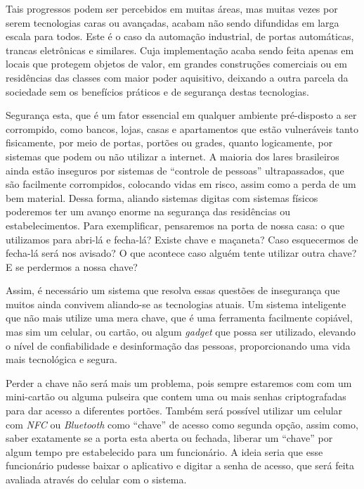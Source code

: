 \documentclass[12pt]{article}
\begin{document}
Tais progressos podem ser percebidos em muitas áreas, mas muitas vezes por serem tecnologias caras ou avançadas, acabam não sendo difundidas em larga escala para todos. Este é o caso da automação industrial, de portas automáticas, trancas eletrônicas e similares. Cuja implementação acaba sendo feita apenas em locais que protegem objetos de valor, em grandes construções comerciais ou em residências das classes com maior poder aquisitivo, deixando a outra parcela da sociedade sem os benefícios práticos e de segurança destas tecnologias.

Segurança esta, que é um fator essencial em qualquer ambiente pré-disposto a ser corrompido, como bancos, lojas, casas e apartamentos que estão vulneráveis tanto fisicamente,  por meio de portas, portões ou grades, quanto logicamente, por sistemas que podem ou não utilizar a internet. A maioria dos lares brasileiros ainda estão inseguros por sistemas de “controle de pessoas” ultrapassados, que são facilmente corrompidos, colocando vidas em risco, assim como a perda de um bem material. Dessa forma, aliando sistemas digitas com sistemas físicos poderemos ter um avanço enorme na segurança das residências ou estabelecimentos. Para exemplificar, pensaremos na porta de nossa casa: o que utilizamos para abri-lá e fecha-lá? Existe chave e maçaneta? Caso esquecermos de fecha-lá será nos avisado? O que acontece caso alguém tente utilizar outra chave? E se perdermos a nossa chave?

Assim, é necessário um sistema que resolva essas questões de insegurança que muitos ainda convivem aliando-se as tecnologias atuais. Um sistema inteligente que não mais utilize uma mera chave, que é uma ferramenta facilmente copiável, mas sim um celular, ou cartão, ou algum \textit{gadget} que possa ser utilizado, elevando o nível de confiabilidade e desinformação das pessoas, proporcionando uma vida mais tecnológica e segura.

Perder a chave não será mais um problema, pois sempre estaremos com com um mini-cartão ou alguma pulseira que contem uma ou mais  senhas criptografadas para dar acesso a diferentes portões. Também será possível utilizar um celular com \textit{NFC} ou \textit{Bluetooth} como “chave” de acesso  como segunda opção, assim como, saber exatamente se a porta esta aberta ou fechada, liberar um “chave” por algum tempo pre estabelecido para um funcionário. A ideia seria  que esse funcionário pudesse baixar o aplicativo e digitar a senha de acesso, que será feita avaliada através do celular com o sistema.
\end{document}
